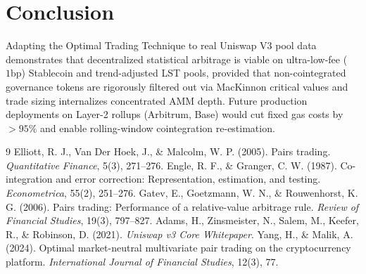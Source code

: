 \documentclass[11pt,a4paper]{article}
\begin{document}
\section{Conclusion}
Adapting the Optimal Trading Technique to real Uniswap V3 pool data demonstrates that decentralized statistical arbitrage is viable on ultra-low-fee ($1\text{bp}$) Stablecoin and trend-adjusted LST pools, provided that non-cointegrated governance tokens are rigorously filtered out via MacKinnon critical values and trade sizing internalizes concentrated AMM depth. Future production deployments on Layer-2 rollups (Arbitrum, Base) would cut fixed gas costs by $>95\%$ and enable rolling-window cointegration re-estimation.
\begin{thebibliography}{9}
\setlength{\itemsep}{1pt}
\small
{} Elliott, R. J., Van Der Hoek, J., \& Malcolm, W. P. (2005). Pairs trading. \textit{Quantitative Finance}, 5(3), 271--276.
 Engle, R. F., \& Granger, C. W. (1987). Co-integration and error correction: Representation, estimation, and testing. \textit{Econometrica}, 55(2), 251--276.
 Gatev, E., Goetzmann, W. N., \& Rouwenhorst, K. G. (2006). Pairs trading: Performance of a relative-value arbitrage rule. \textit{Review of Financial Studies}, 19(3), 797--827.
 Adams, H., Zinsmeister, N., Salem, M., Keefer, R., \& Robinson, D. (2021). \textit{Uniswap v3 Core Whitepaper}.
 Yang, H., \& Malik, A. (2024). Optimal market-neutral multivariate pair trading on the cryptocurrency platform. \textit{International Journal of Financial Studies}, 12(3), 77.
\end{thebibliography}
\end{document}
